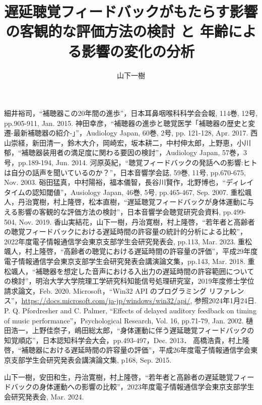 \documentclass[a4paper,12pt]{jsreport}
\title{遅延聴覚フィードバックがもたらす影響の客観的な評価方法の検討
と
年齢による影響の変化の分析}
\author{山下\hspace{1zw}一樹}%
\begin{document}
\makecover%
\tableofcontents%










\begin{thebibliography}{99}
	細井裕司，``補聴器この20年間の進歩''，日本耳鼻咽喉科科学会会報, 114巻, 12号, pp.905-911, Jan. 2015.
  神田幸彦，``補聴器の進歩と聴覚医学「補聴器の歴史と変遷-最新補聴器の紹介-」''，Audiology Japan, 60巻, 2号, pp. 121-128, Apr. 2017.
  西山崇経，新田清一，鈴木大介，岡崎宏，坂本耕二，中村伸太郎，上野恵，小川郁，``補聴器装用者の満足度に関わる要因の検討''，Audiology Japan, 57巻，3号，pp.189-194, Jun. 2014.
  河原英紀，``聴覚フィードバックの発話への影響:ヒトは自分の話声を聞いているのか？''，日本音響学会誌, 59巻, 11号, pp.670-675, Nov. 2003.
  硲田猛真，中村陽裕，福本儀智，長谷川賢作，北野博也，``ディレイタイムの認知閾値''，Ausiology Japan, 46巻, 5号, pp.465-467, Sep. 2007.
  重松颯人，丹治寛樹，村上隆啓，松本直樹，``遅延聴覚フィードバックが身体運動に与える影響の客観的な評価方法の検討''，日本音響学会聴覚研究会資料, pp.499-504, Nov. 2019.
  香山実結花，山下一樹，丹治寛樹，村上隆啓，``若年者と高齢者の聴覚フィードバックにおける遅延時間の許容量の統計的分析による比較''，2022年度電子情報通信学会東京支部学生会研究発表会, pp.113, Mar. 2023.
  重松颯人，村上隆啓，``高齢者の聴覚における遅延時間の許容量の評価''，平成29年度電子情報通信学会東京支部学生会研究発表会講演論文集，pp.143, Mar. 2018.
  重松颯人，``補聴器を想定した音声における入出力の遅延時間の許容範囲についての検討''，明治大学大学院理工学研究科知能信号処理研究室，2019年度修士学位請求論文，Feb. 2020.
  Microsoft，``Win32 API のプログラミング リファレンス''，\url{https://docs.microsoft.com/ja-jp/windows/win32/api/}, 参照2024年1月24日.
  P. Q. Pfordresher and C. Palmer, ``Effects of delayed auditory feedback on timing of music performance''，Psychological Research, Vol. 16, pp.71-79, Jan. 2002.
  樋田浩一，上野佳奈子，嶋田総太郎，``身体運動に伴う遅延聴覚フィードバックの知覚順応''，日本認知科学会大会，pp.493-497，Dec. 2013．
  高橋浩貴，村上隆啓，``補聴器における遅延時間の許容量の評価''，平成26年度電子情報通信学会東京支部学生会研究発表会講演論文集, p168, Sep. 2015.

\end{thebibliography}
\begin{thepublished}{99}
	山下一樹，安田和生，丹治寛樹，村上隆啓，``若年者と高齢者の遅延聴覚フィードバックの身体運動への影響の比較''，2023年度電子情報通信学会東京支部学生会研究発表会, Mar. 2024.
	
\end{thepublished}
\newpage



\appendix




\end{document}
